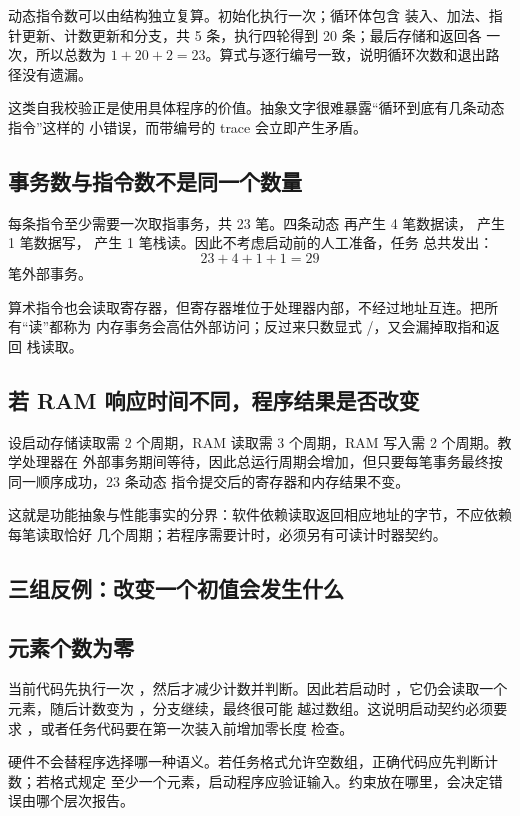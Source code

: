 动态指令数可以由结构独立复算。初始化执行一次；循环体包含
装入、加法、指针更新、计数更新和分支，共 5 条，执行四轮得到 20 条；最后存储和返回各
一次，所以总数为 \(1+20+2=23\)。算式与逐行编号一致，说明循环次数和退出路径没有遗漏。

这类自我校验正是使用具体程序的价值。抽象文字很难暴露“循环到底有几条动态指令”这样的
小错误，而带编号的 trace 会立即产生矛盾。

\subsection{事务数与指令数不是同一个数量}

每条指令至少需要一次取指事务，共 23 笔。四条动态  再产生 4 笔数据读，
 产生 1 笔数据写， 产生 1 笔栈读。因此不考虑启动前的人工准备，任务
总共发出：
\[
23+4+1+1=29
\]
笔外部事务。

算术指令也会读取寄存器，但寄存器堆位于处理器内部，不经过地址互连。把所有“读”都称为
内存事务会高估外部访问；反过来只数显式 /，又会漏掉取指和返回
栈读取。

\subsection{若 RAM 响应时间不同，程序结果是否改变}

设启动存储读取需 2 个周期，RAM 读取需 3 个周期，RAM 写入需 2 个周期。教学处理器在
外部事务期间等待，因此总运行周期会增加，但只要每笔事务最终按同一顺序成功，23 条动态
指令提交后的寄存器和内存结果不变。

这就是功能抽象与性能事实的分界：软件依赖读取返回相应地址的字节，不应依赖每笔读取恰好
几个周期；若程序需要计时，必须另有可读计时器契约。

\subsection{三组反例：改变一个初值会发生什么}

\subsection{元素个数为零}

当前代码先执行一次 ，然后才减少计数并判断。因此若启动时
，它仍会读取一个元素，随后计数变为 ，分支继续，最终很可能
越过数组。这说明启动契约必须要求 ，或者任务代码要在第一次装入前增加零长度
检查。

硬件不会替程序选择哪一种语义。若任务格式允许空数组，正确代码应先判断计数；若格式规定
至少一个元素，启动程序应验证输入。约束放在哪里，会决定错误由哪个层次报告。


